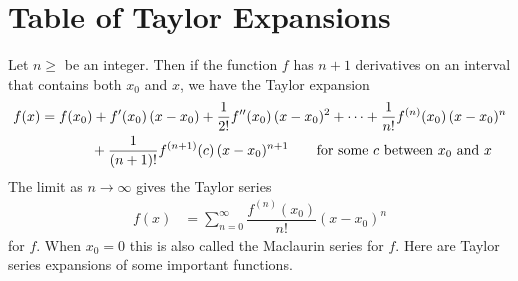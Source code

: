 
\chapter{Table of Taylor Expansions}\label{app taylor}


Let $n\ge $ be an integer. Then if the function $f$ has $n+1$ derivatives on an interval that contains both $x_0$ and $x$, we have the Taylor expansion
\begin{align*}
f(x)&=f(x_0)+f'(x_0)\,(x-x_0)+\dfrac{1}{2!}f''(x_0)\,(x-x_0)^2+\cdots
+\dfrac{1}{n!}f^{(n)}(x_0)\,(x-x_0)^n\\ &\hskip0.5in
+\dfrac{1}{(n+1)!}f^{(n+1)}(c)\,(x-x_0)^{n+1}\qquad\hbox{for some $c$ between
$x_0$ and $x$}
\end{align*}
The limit as $n\rightarrow\infty$ gives the Taylor series
\begin{align*}
f(x)&=\sum_{n=0}^\infty\dfrac{f^{(n)}(x_0)}{n!}(x-x_0)^n
\end{align*}
for $f$. When $x_0=0$ this is also called the Maclaurin series for $f$.
Here are Taylor series expansions of some important functions.
